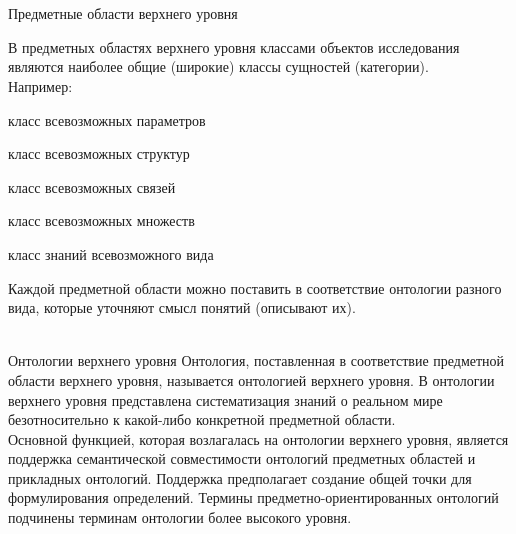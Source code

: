 \begin{frame}{\\}
	\topline
	\justifying
	\begin{SCn}
	\end{SCn}
\end{frame}


\begin{frame}{\\Предметные области верхнего уровня}
	\topline
	\justifying
	
	В предметных областях верхнего уровня классами объектов исследования являются наиболее общие (широкие) классы сущностей (категории). \\
	Например:
	\begin{textitemize}
		\item класс всевозможных параметров
		\item класс всевозможных структур
		\item класс всевозможных связей
		\item класс всевозможных множеств
		\item класс знаний всевозможного вида
	\end{textitemize}

	Каждой предметной области можно поставить в соответствие онтологии разного вида, которые уточняют смысл понятий (описывают их).
\end{frame}

\begin{frame}{\\Онтологии верхнего уровня}
	\topline
	\justifying
	 Онтология, поставленная в соответствие предметной области верхнего уровня, называется онтологией верхнего уровня. В онтологии верхнего уровня представлена систематизация знаний о реальном мире безотносительно к какой-либо конкретной предметной области. \\\vspace{3mm}
	 Основной функцией, которая возлагалась на онтологии верхнего уровня, является поддержка семантической совместимости онтологий предметных областей и прикладных онтологий. Поддержка предполагает создание общей точки для формулирования определений. Термины предметно-ориентированных онтологий подчинены терминам онтологии более высокого уровня. \\
\end{frame}
